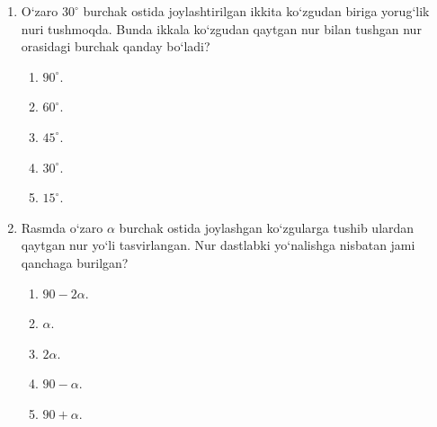 \begin{enumerate}
\item O‘zaro $30^\circ$ burchak ostida joylashtirilgan ikkita ko‘zgudan biriga yorug‘lik nuri tushmoqda. Bunda ikkala ko‘zgudan qaytgan nur bilan tushgan nur orasidagi burchak qanday bo‘ladi?
\begin{enumerate}[label=\Alph*)]
\item $90^\circ$.
\item $60^\circ$.
\item $45^\circ$.
\item $30^\circ$.
\item $15^\circ$.
\end{enumerate}

\item Rasmda o‘zaro $\alpha$ burchak ostida joylashgan ko‘zgularga tushib ulardan qaytgan nur yo‘li tasvirlangan. Nur dastlabki yo‘nalishga nisbatan jami qanchaga burilgan?


\begin{enumerate}[label=\Alph*)]
\item $90-2\alpha$.
\item $\alpha$.
\item $2\alpha$.
\item $90-\alpha$.
\item $90+\alpha$.
\end{enumerate}


\end{enumerate}

